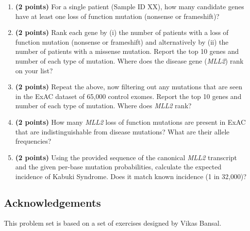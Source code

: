 \documentclass[12pt]{article}
\begin{document}
\begin{enumerate}

\item \textbf{(2 points)} For a single patient (Sample ID XX), how many candidate genes have at least one loss of function mutation (nonsense or frameshift)?

\item \textbf{(2 points)} Rank each gene by (i) the number of patients with a loss of function mutation (nonsense or frameshift) and alternatively by (ii) the number of patients with a missense mutation. Report the top 10 genes and number of each type of mutation. Where does the disease gene (\emph{MLL2}) rank on your list?

\item \textbf{(2 points)} Repeat the above, now filtering out any mutations that are seen in the ExAC dataset of 65,000 control exomes. Report the top 10 genes and number of each type of mutation. Where does \emph{MLL2} rank?

\item \textbf{(2 points)} How many \emph{MLL2} loss of function mutations are present in ExAC that are indistinguishable from disease mutations? What are their allele frequencies?

\item \textbf{(2 points)} Using the provided sequence of the canonical \emph{MLL2} transcript and the given per-base mutation probabilities, calculate the expected incidence of Kabuki Syndrome. Does it match known incidence (1 in 32,000)?

\end{enumerate}

\subsection*{Acknowledgements}
This problem set is based on a set of exercises designed by Vikas Bansal.
\end{document}
